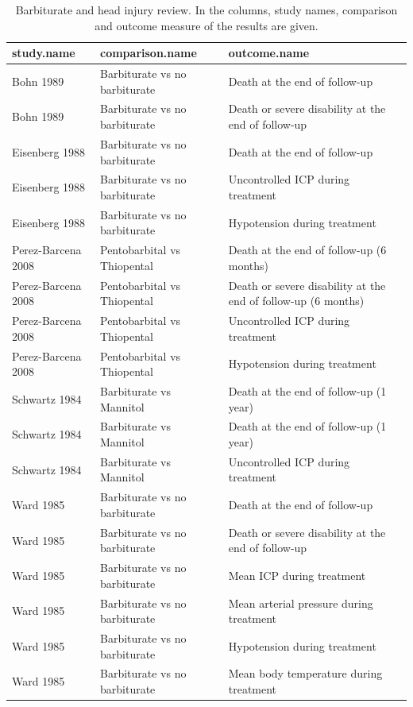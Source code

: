 \documentclass[11pt,a4paper,twoside]{book}\usepackage[]{graphicx}\usepackage[]{color}
\begin{document}
\begin{table}[ht]
\centering
\begingroup\footnotesize
\begin{tabular}{lll}
  \hline
study.name & comparison.name & outcome.name \\ 
  \hline
Bohn 1989 & Barbiturate vs no barbiturate & Death at the end of follow-up \\ 
  Bohn 1989 & Barbiturate vs no barbiturate & Death or severe disability at the end of follow-up \\ 
  Eisenberg 1988 & Barbiturate vs no barbiturate & Death at the end of follow-up \\ 
  Eisenberg 1988 & Barbiturate vs no barbiturate & Uncontrolled ICP during treatment \\ 
  Eisenberg 1988 & Barbiturate vs no barbiturate & Hypotension during treatment \\ 
  Perez-Barcena 2008 & Pentobarbital vs Thiopental & Death at the end of follow-up (6 months) \\ 
  Perez-Barcena 2008 & Pentobarbital vs Thiopental & Death or severe disability at the end of follow-up (6 months) \\ 
  Perez-Barcena 2008 & Pentobarbital vs Thiopental & Uncontrolled ICP during treatment \\ 
  Perez-Barcena 2008 & Pentobarbital vs Thiopental & Hypotension during treatment \\ 
  Schwartz 1984 & Barbiturate vs Mannitol & Death at the end of follow-up (1 year) \\ 
  Schwartz 1984 & Barbiturate vs Mannitol & Death at the end of follow-up (1 year) \\ 
  Schwartz 1984 & Barbiturate vs Mannitol & Uncontrolled ICP during treatment \\ 
  Ward 1985 & Barbiturate vs no barbiturate & Death at the end of follow-up \\ 
  Ward 1985 & Barbiturate vs no barbiturate & Death or severe disability at the end of follow-up \\ 
  Ward 1985 & Barbiturate vs no barbiturate & Mean ICP during treatment \\ 
  Ward 1985 & Barbiturate vs no barbiturate & Mean arterial pressure during treatment \\ 
  Ward 1985 & Barbiturate vs no barbiturate & Hypotension during treatment \\ 
  Ward 1985 & Barbiturate vs no barbiturate & Mean body temperature during treatment \\ 
   \hline
\end{tabular}
\endgroup
\caption{Barbiturate and head injury review. In the columns, study names, comparison and outcome measure of the results are given.} 
\label{barbiturates}
\end{table}
\end{document}
